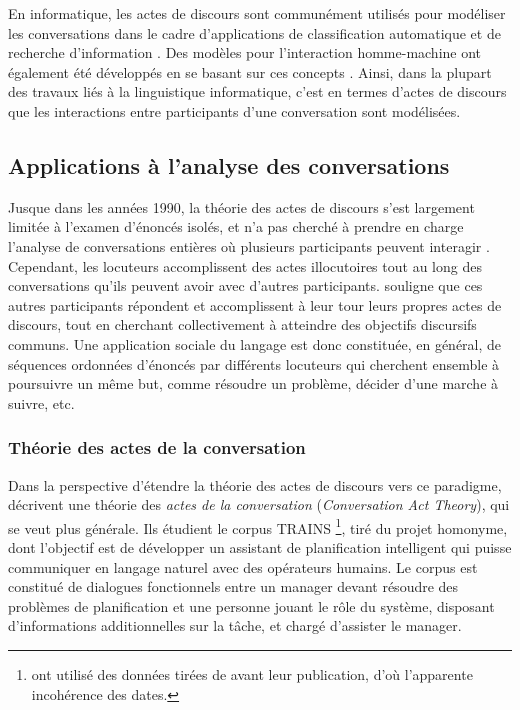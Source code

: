 \documentclass[10pt,a4paper,twoside]{article}
\begin{document}
En informatique, les actes de discours sont communément utilisés pour modéliser les conversations dans le cadre d'applications de classification automatique et de recherche d'information \cite{twitchell2004using}. Des modèles pour l'interaction homme-machine ont également été développés en se basant sur ces concepts \cite{morelli1991computational}. Ainsi, dans la plupart des travaux liés à la linguistique informatique, c’est en termes d’actes de discours que les interactions entre participants d’une conversation sont modélisées.

\subsection{Applications à l'analyse des conversations}
\label{subsec:applications_in_conversation_analysis}

Jusque dans les années 1990, la théorie des actes de discours s'est largement limitée à l'examen d'énoncés isolés, et n'a pas cherché à prendre en charge l'analyse de conversations entières où plusieurs participants peuvent interagir \cite{vanderveken1994theorie}. Cependant, les locuteurs accomplissent des actes illocutoires tout au long des conversations qu'ils peuvent avoir avec d'autres participants. \citeauthor{vanderveken1994theorie} souligne que ces autres participants répondent et accomplissent à leur tour leurs propres actes de discours, tout en cherchant collectivement à atteindre des objectifs discursifs communs. Une application sociale du langage est donc constituée, en général, de séquences ordonnées d'énoncés par différents locuteurs qui cherchent ensemble à poursuivre un même but, comme résoudre un problème, décider d'une marche à suivre, etc.

\subsubsection{Théorie des actes de la conversation}

Dans la perspective d'étendre la théorie des actes de discours vers ce paradigme, \citet{traum1992conversation} décrivent une théorie des \textit{actes de la conversation} (\textit{Conversation Act Theory}), qui se veut plus générale. Ils étudient le corpus TRAINS \cite{gross1993trains}\footnote{\citeauthor{traum1992conversation} ont utilisé des données tirées de \cite{gross1993trains} avant leur publication, d'où l'apparente incohérence des dates.}, tiré du projet homonyme, dont l'objectif est de développer un assistant de planification intelligent qui puisse communiquer en langage naturel avec des opérateurs humains. Le corpus est constitué de dialogues fonctionnels entre un manager devant résoudre des problèmes de planification et une personne jouant le rôle du système, disposant d'informations additionnelles sur la tâche, et chargé d'assister le manager. 
\end{document}
